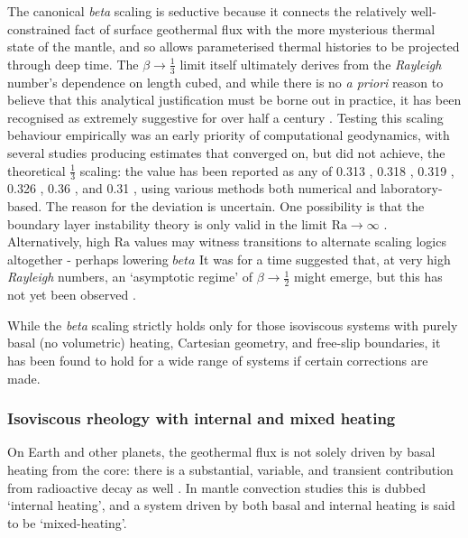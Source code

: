 \documentclass[a4paper,11pt,oneside]{book}
\begin{document}
The canonical \textit{beta} scaling is seductive because it connects the relatively well-constrained fact of surface geothermal flux with the more mysterious thermal state of the mantle, and so allows parameterised thermal histories to be projected through deep time. The $\beta \to \frac{1}{3}$ limit itself ultimately derives from the \textit{Rayleigh} number's dependence on length cubed, and while there is no \textit{a priori} reason to believe that this analytical justification must be borne out in practice, it has been recognised as extremely suggestive for over half a century \cite{Chan1971-xv}. Testing this scaling behaviour empirically was an early priority of computational geodynamics, with several studies producing estimates that converged on, but did not achieve, the theoretical $\frac{1}{3}$ scaling: the value has been reported as any of 0.313 \cite{Jarvis1982-ua}, 0.318 \cite{Jarvis1986-me}, 0.319 \cite{Schubert1985-sy}, 0.326 \cite{Jarvis1989-qj}, 0.36 \cite{Quareni1985-ff}, and 0.31 \cite{Niemela2000-cu}, using various methods both numerical and laboratory-based. The reason for the deviation is uncertain. One possibility is that the boundary layer instability theory is only valid in the limit $\mathrm{Ra}\to\infty$ \cite{Olson1987-do}. Alternatively, high $\mathrm{Ra}$ values may witness transitions to alternate scaling logics altogether - perhaps lowering $beta$  It was for a time suggested that, at very high \textit{Rayleigh} numbers, an `asymptotic regime' of $\beta \to \frac{1}{2}$ might emerge, but this has not yet been observed \cite{Niemela2000-cu}.

While the \textit{beta} scaling strictly holds only for those isoviscous systems with purely basal (no volumetric) heating, Cartesian geometry, and free-slip boundaries, it has been found to hold for a wide range of systems if certain corrections are made.

\subsubsection{Isoviscous rheology with internal and mixed heating}

On Earth and other planets, the geothermal flux is not solely driven by basal heating from the core: there is a substantial, variable, and transient contribution from radioactive decay as well \cite{Daly1980-xl}. In mantle convection studies this is dubbed `internal heating', and a system driven by both basal and internal heating is said to be `mixed-heating'.
\end{document}
